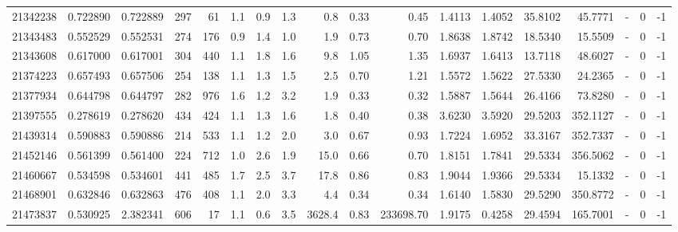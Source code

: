 \begin{tabular}{rrrrrrrrrrrrrrrlrr}
  21342238 & 0.722890 &   0.722889 &  297 &   61 &      1.1 &      0.9 &     1.3 &      0.8 &       0.33 &        0.45 &  1.4113 &  1.4052 &   35.8102 &   45.7771 &             - &        0 &         -1 \\
  21343483 & 0.552529 &   0.552531 &  274 &  176 &      0.9 &      1.4 &     1.0 &      1.9 &       0.73 &        0.70 &  1.8638 &  1.8742 &   18.5340 &   15.5509 &             - &        0 &         -1 \\
  21343608 & 0.617000 &   0.617001 &  304 &  440 &      1.1 &      1.8 &     1.6 &      9.8 &       1.05 &        1.35 &  1.6937 &  1.6413 &   13.7118 &   48.6027 &             - &        0 &         -1 \\
  21374223 & 0.657493 &   0.657506 &  254 &  138 &      1.1 &      1.3 &     1.5 &      2.5 &       0.70 &        1.21 &  1.5572 &  1.5622 &   27.5330 &   24.2365 &             - &        0 &         -1 \\
  21377934 & 0.644798 &   0.644797 &  282 &  976 &      1.6 &      1.2 &     3.2 &      1.9 &       0.33 &        0.32 &  1.5887 &  1.5644 &   26.4166 &   73.8280 &             - &        0 &         -1 \\
  21397555 & 0.278619 &   0.278620 &  434 &  424 &      1.1 &      1.3 &     1.6 &      1.8 &       0.40 &        0.38 &  3.6230 &  3.5920 &   29.5203 &  352.1127 &             - &        0 &         -1 \\
  21439314 & 0.590883 &   0.590886 &  214 &  533 &      1.1 &      1.2 &     2.0 &      3.0 &       0.67 &        0.93 &  1.7224 &  1.6952 &   33.3167 &  352.7337 &             - &        0 &         -1 \\
  21452146 & 0.561399 &   0.561400 &  224 &  712 &      1.0 &      2.6 &     1.9 &     15.0 &       0.66 &        0.70 &  1.8151 &  1.7841 &   29.5334 &  356.5062 &             - &        0 &         -1 \\
  21460667 & 0.534598 &   0.534601 &  441 &  485 &      1.7 &      2.5 &     3.7 &     17.8 &       0.86 &        0.83 &  1.9044 &  1.9366 &   29.5334 &   15.1332 &             - &        0 &         -1 \\
  21468901 & 0.632846 &   0.632863 &  476 &  408 &      1.1 &      2.0 &     3.3 &      4.4 &       0.34 &        0.34 &  1.6140 &  1.5830 &   29.5290 &  350.8772 &             - &        0 &         -1 \\
  21473837 & 0.530925 &   2.382341 &  606 &   17 &      1.1 &      0.6 &     3.5 &   3628.4 &       0.83 &   233698.70 &  1.9175 &  0.4258 &   29.4594 &  165.7001 &             - &        0 &         -1 \\

\end{tabular}
